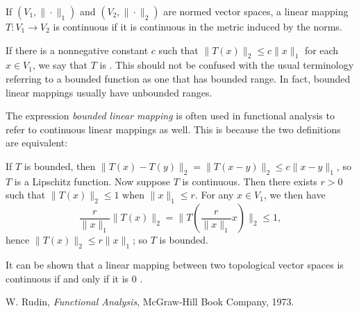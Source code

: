 \documentclass[12pt]{article}
\begin{document}
If $(V_1,\|\cdot\|_1)$ and $(V_2,\|\cdot\|_2)$ are normed vector spaces, a linear mapping $T:V_1\rightarrow V_2$ is continuous if it is continuous in the metric induced by the norms. 

If there is a nonnegative constant $c$ such that 
$\|T(x)\|_2\leq c\|x\|_1$ for each $x\in V_1$, we say that $T$ is \emph{}. This should not be confused with the usual terminology referring to a bounded function as one that has bounded range. In fact, bounded linear mappings usually have unbounded ranges. 

The expression \emph{bounded linear mapping} is often  used in functional analysis to refer to continuous linear mappings as well. This is because the two definitions are equivalent:

If $T$ is bounded, then $\|T(x)-T(y)\|_2 = \|T(x-y)\|_2 \leq c\|x-y\|_1$, so $T$ is a Lipschitz function. Now suppose $T$ is continuous. Then there exists $r>0$ such that $\|T(x)\|_2 \leq 1$ when $\|x\|_1\leq r$. For any $x\in V_1$,  we then have \[\frac{r}{\|x\|_1}\|T(x)\|_2 = \|T\left(\frac{r}{\|x\|_1}x\right)\|_2 \leq 1,\]
hence $\|T(x)\|_2\leq r\|x\|_1$; so $T$ is bounded.

It can be shown that a linear mapping between two topological vector spaces is continuous if and only if it is  $0$ \cite{rudin_fap}.

\begin{thebibliography}{9}
 W. Rudin, \emph{Functional Analysis},
 McGraw-Hill Book Company, 1973.
\end{thebibliography}
\end{document}
